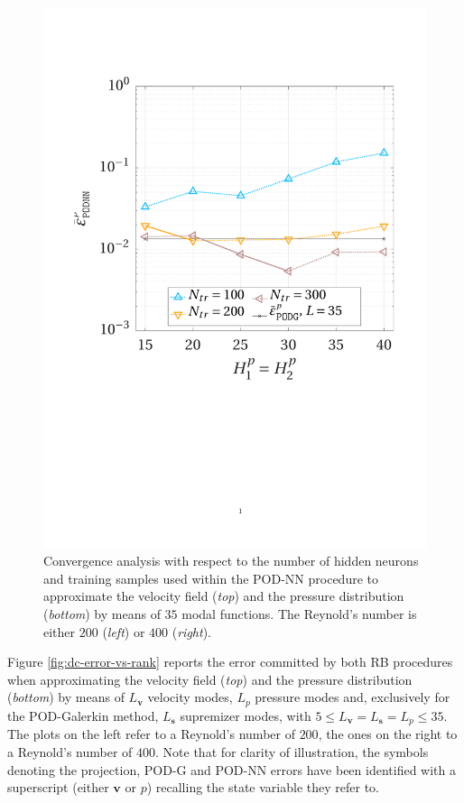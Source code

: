 \documentclass[longtitle]{elsarticle}
\numberwithin{equation}{section}
\theoremstyle{theorem}
\theoremstyle{definition}
\theoremstyle{remark}
\theoremstyle{proposition}
\numberwithin{figure}{section}
\newcommand{\bg}[1]{\boldsymbol{#1}}
\begin{document}
\begin{figure}[h!]
			\includegraphics[scale = 0.37, trim = {1cm 9cm 1.5cm 3.5cm}, clip]{dc_400_p_nn_convergence}
			
			\vspace*{-0.1cm}
			
			\caption{Convergence analysis with respect to the number of hidden neurons and training samples used within the POD-NN procedure to approximate the velocity field (\emph{top}) and the pressure distribution (\emph{bottom}) by means of $35$ modal functions. The Reynold's number is either $200$ (\emph{left}) or $400$ (\emph{right}).}
			\label{fig:dc-nn-convergence}
		\end{figure}

		Figure \ref{fig:dc-error-vs-rank} reports the error committed by both RB procedures when approximating the velocity field (\emph{top}) and the pressure distribution (\emph{bottom}) by means of $L_{\bg{v}}$ velocity modes, $L_p$ pressure modes and, exclusively for the POD-Galerkin method, $L_{\bg{s}}$ supremizer modes, with $5 \leq L_{\bg{v}} = L_{\bg{s}} = L_p \leq 35$. The plots on the left refer to a Reynold's number of $200$, the ones on the right to a Reynold's number of $400$. Note that for clarity of illustration, the symbols denoting the projection, POD-G and POD-NN errors have been identified with a superscript (either $\bg{v}$ or $p$) recalling the state variable they refer to. 
\end{document}
